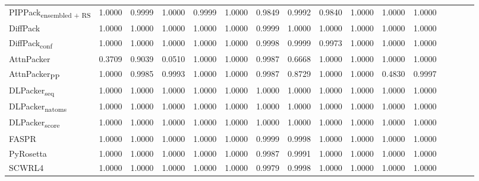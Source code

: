 \begin{table}
{\begin{tabular}{@{}lccccccccccccccc@{}}
                \textnormal{\hspace{0.5cm}PIPPack\textsubscript{ensembled + RS}} & 1.0000 & 0.9999 & 1.0000 & 0.9999 & 1.0000 & 0.9849 & 0.9992 & 0.9840 & 1.0000 & 1.0000 & 1.0000 \\
                \textnormal{\hspace{0.5cm}DiffPack} & 1.0000 & 1.0000 & 1.0000 & 1.0000 & 1.0000 & 0.9999 & 1.0000 & 1.0000 & 1.0000 & 1.0000 & 1.0000 \\
                \textnormal{\hspace{0.5cm}DiffPack\textsubscript{conf}} & 1.0000 & 1.0000 & 1.0000 & 1.0000 & 1.0000 & 0.9998 & 0.9999 & 0.9973 & 1.0000 & 1.0000 & 1.0000 \\
                \textnormal{\hspace{0.5cm}AttnPacker} & 0.3709 & 0.9039 & 0.0510 & 1.0000 & 1.0000 & 0.9987 & 0.6668 & 1.0000 & 1.0000 & 1.0000 & 1.0000 \\
                \textnormal{\hspace{0.5cm}AttnPacker\textsubscript{PP}} & 1.0000 & 0.9985 & 0.9993 & 1.0000 & 1.0000 & 0.9987 & 0.8729 & 1.0000 & 1.0000 & 0.4830 & 0.9997 \\
                \textnormal{\hspace{0.5cm}DLPacker\textsubscript{seq}} & 1.0000 & 1.0000 & 1.0000 & 1.0000 & 1.0000 & 1.0000 & 1.0000 & 1.0000 & 1.0000 & 1.0000 & 1.0000 \\
                \textnormal{\hspace{0.5cm}DLPacker\textsubscript{natoms}} & 1.0000 & 1.0000 & 1.0000 & 1.0000 & 1.0000 & 1.0000 & 1.0000 & 1.0000 & 1.0000 & 1.0000 & 1.0000 \\
                \textnormal{\hspace{0.5cm}DLPacker\textsubscript{score}} & 1.0000 & 1.0000 & 1.0000 & 1.0000 & 1.0000 & 1.0000 & 1.0000 & 1.0000 & 1.0000 & 1.0000 & 1.0000 \\
                \textnormal{\hspace{0.5cm}FASPR} & 1.0000 & 1.0000 & 1.0000 & 1.0000 & 1.0000 & 0.9999 & 0.9998 & 1.0000 & 1.0000 & 1.0000 & 1.0000 \\
                \textnormal{\hspace{0.5cm}PyRosetta} & 1.0000 & 1.0000 & 1.0000 & 1.0000 & 1.0000 & 0.9987 & 0.9991 & 1.0000 & 1.0000 & 1.0000 & 1.0000 \\
                \textnormal{\hspace{0.5cm}SCWRL4} & 1.0000 & 1.0000 & 1.0000 & 1.0000 & 1.0000 & 0.9979 & 0.9998 & 1.0000 & 1.0000 & 1.0000 & 1.0000 \\

\end{tabular}}
\end{table}
